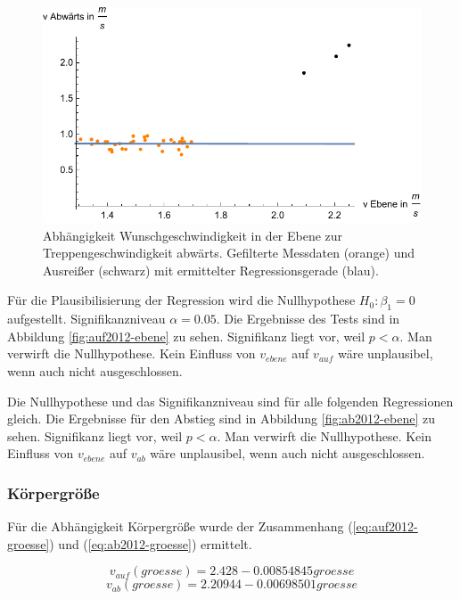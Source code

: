 \begin{figure} \centering 
	\includegraphics[]{abbildungen/regression/2012/ohneausreisser/ab-ebene.pdf}
	
	\caption{Abhängigkeit Wunschgeschwindigkeit in der Ebene zur Treppengeschwindigkeit abwärts. Gefilterte Messdaten (orange) und Ausreißer (schwarz) mit ermittelter Regressionsgerade (blau).
	\label{fig:ohne-ab2012-ebene}}
\end{figure}

Für die Plausibilisierung der Regression wird die Nullhypothese 
$H_0: \beta_1 = 0$ aufgestellt. Signifikanzniveau $\alpha = 0.05$.
Die Ergebnisse des Tests sind in Abbildung \ref{fig:auf2012-ebene} zu sehen.
Signifikanz liegt vor, weil $p < \alpha$. Man verwirft die
Nullhypothese. Kein Einfluss von $v_{ebene}$ auf $v_{auf}$ wäre unplausibel, wenn auch nicht ausgeschlossen.

Die Nullhypothese und das Signifikanzniveau sind für alle folgenden Regressionen gleich. Die Ergebnisse für den Abstieg sind in Abbildung \ref{fig:ab2012-ebene} zu sehen.
Signifikanz liegt vor, weil $p < \alpha$. Man verwirft die
Nullhypothese. Kein Einfluss von $v_{ebene}$ auf $v_{ab}$ wäre unplausibel, wenn auch nicht ausgeschlossen.

\subsubsection{Körpergröße}

Für die Abhängigkeit Körpergröße wurde 
der Zusammenhang (\ref{eq:auf2012-groesse}) und (\ref{eq:ab2012-groesse}) ermittelt.

\begin{equation} \label{eq:auf2012-groesse}
	v_{auf}(groesse) = 2.428 - 0.00854845 groesse
\end{equation}
\begin{equation} \label{eq:ab2012-groesse}
	v_{ab}(groesse) = 2.20944 - 0.00698501 groesse
\end{equation}

